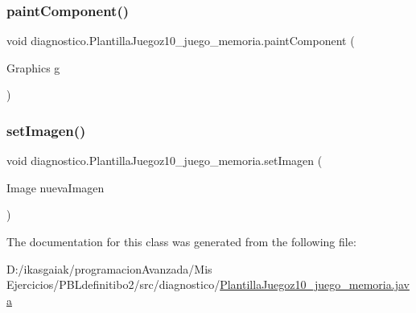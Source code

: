 \subsubsection{\texorpdfstring{paint\+Component()}{paintComponent()}}
{\footnotesize\ttfamily void diagnostico.\+Plantilla\+Juegoz10\+\_\+juego\+\_\+memoria.\+paint\+Component (\begin{DoxyParamCaption}\item[{Graphics}]{g }\end{DoxyParamCaption})\hspace{0.3cm}{\ttfamily [protected]}}

\mbox{\label{classdiagnostico_1_1_plantilla_juegoz10__juego__memoria_a58e70f67d5862f856d0bdece2665293b}} 
\subsubsection{\texorpdfstring{set\+Imagen()}{setImagen()}}
{\footnotesize\ttfamily void diagnostico.\+Plantilla\+Juegoz10\+\_\+juego\+\_\+memoria.\+set\+Imagen (\begin{DoxyParamCaption}\item[{Image}]{nueva\+Imagen }\end{DoxyParamCaption})}



The documentation for this class was generated from the following file\+:\begin{DoxyCompactItemize}
\item 
D\+:/ikasgaiak/programacion\+Avanzada/\+Mis Ejercicios/\+P\+B\+Ldefinitibo2/src/diagnostico/\mbox{\hyperlink{_plantilla_juegoz10__juego__memoria_8java}{Plantilla\+Juegoz10\+\_\+juego\+\_\+memoria.\+java}}\end{DoxyCompactItemize}

